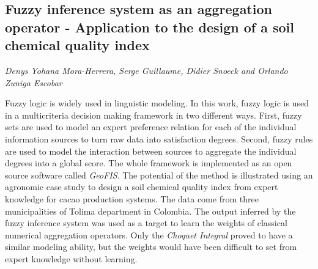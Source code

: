\documentclass[../booklet.tex]{subfiles}
\begin{document}
\subsection[Fuzzy inference system as an aggregation operator -    Application to the design of a soil chemical quality index. {\it Denys Yohana Mora-Herrera, Serge Guillaume, Didier Snoeck and Orlando Zuniga Escobar}]{Fuzzy inference system as an aggregation operator -    Application to the design of a soil chemical quality index}
   

\begin{center}
  {\it Denys Yohana Mora-Herrera, Serge Guillaume, Didier Snoeck and Orlando Zuniga Escobar}
\end{center}

\vskip 0.8cm


  Fuzzy logic is widely used in linguistic modeling. In this work, fuzzy logic is used in a multicriteria decision making framework in two different ways. First, fuzzy sets are used to model an expert preference relation for each of the individual information sources to turn raw data into satisfaction degrees. Second, fuzzy rules are used to model the interaction between sources to aggregate the individual degrees into a global score. The whole framework is implemented as an open source software called \textit{GeoFIS}. The potential of the method is illustrated using an agronomic case study to design a soil chemical quality index from expert knowledge for cacao production systems. The data come from three municipalities of Tolima department in Colombia. The output inferred by the fuzzy inference system was used as a target to learn the weights of classical numerical aggregation operators. Only the \textit{Choquet Integral} proved to have a similar modeling ability, but the weights would have been difficult to set from expert knowledge without learning.
  
\end{document}
